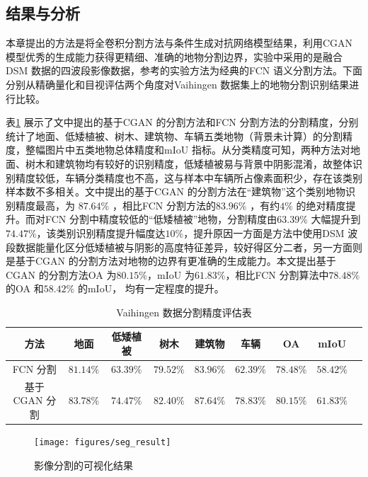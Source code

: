 \subsection{结果与分析}
\label{sec:third-3}

本章提出的方法是将全卷积分割方法与条件生成对抗网络模型结果，利用CGAN 模型优秀的生成能力获得更精细、准确的地物分割边界，实验中采用的是融合DSM 数据的四波段影像数据，参考的实验方法为经典的FCN 语义分割方法。下面分别从精确量化和目视评估两个角度对Vaihingen 数据集上的地物分割识别结果进行比较。

表\ref{tab:seg_refult} 展示了文中提出的基于CGAN 的分割方法和FCN 分割方法的分割精度，分别统计了地面、低矮植被、树木、建筑物、车辆五类地物（背景未计算）的分割精度，整幅图片中五类地物总体精度和mIoU 指标。从分类精度可知，两种方法对地面、树木和建筑物均有较好的识别精度，低矮植被易与背景中阴影混淆，故整体识别精度较低，车辆分类精度也不高，这与样本中车辆所占像素面积少，存在该类别样本数不多相关。文中提出的基于CGAN 的分割方法在“建筑物”这个类别地物识别精度最高，为 $87.64\%$ ，相比FCN 分割方法的$83.96\%$ ，有约$4\%$ 的绝对精度提升。而对FCN 分割中精度较低的“低矮植被”地物，分割精度由$63.39\%$ 大幅提升到$74.47\%$，该类别识别精度提升幅度达$10\%$，提升原因一方面是方法中使用DSM 波段数据能量化区分低矮植被与阴影的高度特征差异，较好得区分二者，另一方面则是基于CGAN 的分割方法对地物的边界有更准确的生成能力。本文提出基于CGAN 的分割方法OA 为$80.15\%$，mIoU 为$61.83\%$，相比FCN 分割算法中$78.48\%$ 的OA 和$58.42\%$ 的mIoU， 均有一定程度的提升。

\begin{table}[htbp]
  \caption{Vaihingen 数据分割精度评估表}\label{tab:seg_refult}
  \centering
  \begin{tabular}{ccccccccc}
    \toprule
    方法              & 地面 & 低矮植被 & 树木 & 建筑物 & 车辆 & OA & mIoU \\
    \midrule
    FCN 分割      & $81.14\%$ & $63.39\%$ & $79.52\%$ & $83.96\%$ & $62.39\%$   & $78.48\%$ & $58.42\%$ \\
    基于CGAN 分割 & $83.78\%$ & $74.47\%$ & $82.40\%$ & $87.64\%$ & $78.83\%$ & $80.15\%$ & \textbf{$61.83\%$} \\
    \bottomrule
  \end{tabular}
\end{table}

\begin{figure}[htb]
  \centering
  \texttt{[image: figures/seg\_result]}
  \caption{影像分割的可视化结果}\label{fig:seg_result}
\end{figure}


